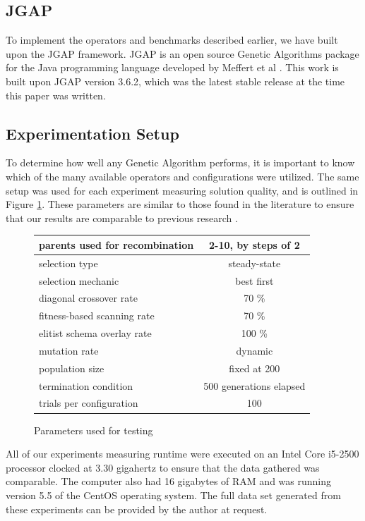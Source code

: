 \subsection*{JGAP}
To implement the operators and benchmarks described earlier, we have built upon the JGAP framework. JGAP is an open source Genetic Algorithms package for the Java programming language developed by Meffert et al \cite{jgap}. This work is built upon JGAP version 3.6.2, which was the latest stable release at the time this paper was written.

\subsection*{Experimentation Setup}

To determine how well any Genetic Algorithm performs, it is important to know which of the many available operators and configurations were utilized. The same setup was used for each experiment measuring solution quality, and is outlined in Figure \ref{fig:GA-config}. These parameters are similar to those found in the literature to ensure that our results are comparable to previous research \cite{Sudholt12, Eiben95, Eiben96}. 

\begin{figure}[h!]
\begin{center}
\begin{tabular}{ | l | c | }
\hline
parents used for recombination & 2-10, by steps of 2 \\
\hline
selection type & steady-state \\
\hline
selection mechanic & best first \\
\hline
diagonal crossover rate & 70 \% \\
\hline
fitness-based scanning rate & 70 \% \\
\hline
elitist schema overlay rate & 100 \% \\
\hline
mutation rate & dynamic \cite{Back93} \\
\hline
population size & fixed at 200 \\
\hline
termination condition & 500 generations elapsed \\
\hline
trials per configuration & 100 \\
\hline
\end{tabular}
\caption{Parameters used for testing}
\label{fig:GA-config}
\end{center}
\end{figure}

All of our experiments measuring runtime were executed on an Intel Core i5-2500 processor clocked at 3.30 gigahertz to ensure that the data gathered was comparable. The computer also had 16 gigabytes of RAM and was running version 5.5 of the CentOS operating system. The full data set generated from these experiments can be provided by the author at request.

